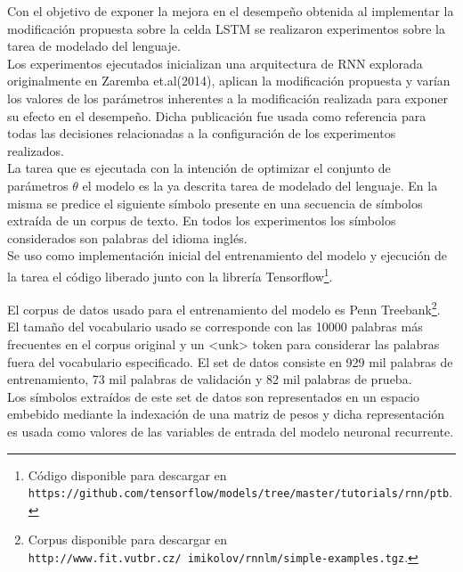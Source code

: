 \documentclass{article}
\begin{document}
	Con el objetivo de exponer la mejora en el desempeño obtenida al implementar la modificación propuesta sobre la celda LSTM se realizaron experimentos sobre la tarea de modelado del lenguaje.\\ Los experimentos ejecutados inicializan una arquitectura de RNN explorada originalmente en Zaremba et.al(2014)\cite{14RegularizationZaremba}, aplican la modificación propuesta y varían los valores de los parámetros inherentes a la modificación realizada para exponer su efecto en el desempeño. Dicha publicación fue usada como referencia para todas las decisiones relacionadas a la configuración de los experimentos realizados.\\
	
	La tarea que es ejecutada con la intención de optimizar el conjunto de parámetros $\theta$ el modelo es la ya descrita tarea de modelado del lenguaje. En la misma se predice el siguiente símbolo presente en una secuencia de símbolos extraída de un corpus de texto. En todos los experimentos los símbolos considerados son palabras del idioma inglés.\\
	Se uso como implementación inicial del entrenamiento del modelo y ejecución de la tarea el código liberado junto con la librería Tensorflow\footnote{Código disponible para descargar en \texttt{https://github.com/tensorflow/models/tree/master/tutorials/rnn/ptb}.}.
	
	El corpus de datos usado para el entrenamiento del modelo es Penn Treebank\cite{41PennTreebankMarcus}\footnote{Corpus disponible para descargar en  \texttt{http://www.fit.vutbr.cz/~imikolov/rnnlm/simple-examples.tgz}.}. El tamaño del vocabulario usado se corresponde con las 10000 palabras más frecuentes en el corpus original y un <unk> token para considerar las palabras fuera del vocabulario especificado. El set de datos consiste en 929 mil palabras de entrenamiento, 73 mil palabras de validación y 82 mil palabras de prueba.\\
	Los símbolos extraídos de este set de datos son representados en un espacio embebido mediante la indexación de una matriz de pesos y dicha representación es usada como valores de las variables de entrada del modelo neuronal recurrente. \\
	
\end{document}
